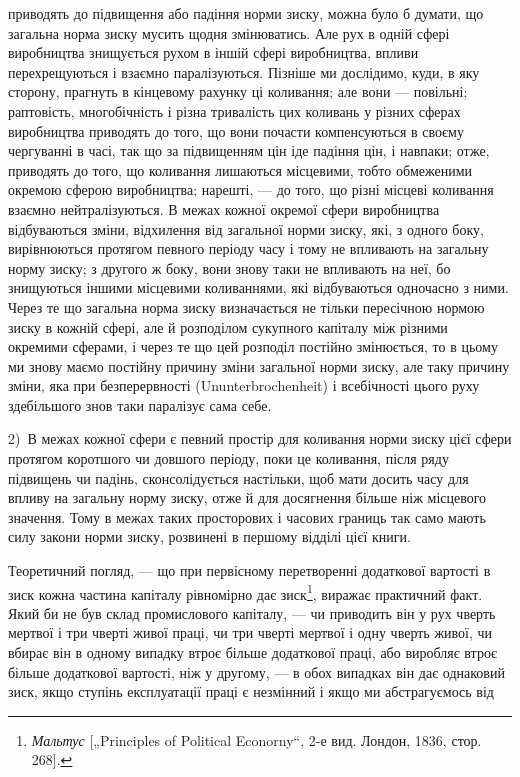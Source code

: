 \parcont{}  %
приводять до підвищення або падіння норми зиску, можна було б думати, що загальна норма зиску мусить
щодня змінюватись. Але рух в одній сфері виробництва знищується рухом в іншій сфері виробництва,
впливи перехрещуються і взаємно
паралізуються. Пізніше ми дослідимо, куди, в яку сторону, прагнуть в кінцевому рахунку ці коливання;
але вони — повільні;
раптовість, многобічність і різна тривалість цих коливань у
різних сферах виробництва приводять до того, що вони почасти компенсуються в своєму чергуванні в
часі, так що за
підвищенням цін іде падіння цін, і навпаки; отже, приводять до того, що коливання лишаються
місцевими, тобто обмеженими окремою сферою виробництва; нарешті, — до того, що різні місцеві
коливання взаємно нейтралізуються. В межах кожної окремої сфери виробництва відбуваються зміни,
відхилення
від загальної норми зиску, які, з одного боку, вирівнюються
протягом певного періоду часу і тому не впливають на загальну
норму зиску; з другого ж боку, вони знову таки не впливають
на неї, бо знищуються іншими місцевими коливаннями, які відбуваються одночасно з ними. Через те що
загальна норма зиску
визначається не тільки пересічною нормою зиску в кожній сфері,
але й розподілом сукупного капіталу між різними окремими
сферами, і через те що цей розподіл постійно змінюється, то
в цьому ми знову маємо постійну причину зміни загальної норми
зиску, але таку причину зміни, яка при безперервності (Ununterbrochenheit)
і всебічності цього руху
здебільшого знов таки
паралізує сама себе.

2)~В межах кожної сфери є певний простір для коливання
норми зиску цієї сфери протягом коротшого чи довшого періоду, поки це коливання, після ряду
підвищень чи падінь,
сконсолідується настільки, щоб мати досить часу для впливу
на загальну норму зиску, отже й для досягнення більше ніж
місцевого значення. Тому в межах таких просторових і часових границь так само мають силу закони
норми зиску, розвинені в першому відділі цієї книги.

Теоретичний погляд, — що при первісному перетворенні додаткової вартості в зиск кожна частина
капіталу рівномірно
дає зиск\footnote{
\emph{Мальтус} [„Principles of Political Econorny“, 2-е вид. Лондон, 1836, стор. 268].
}, виражає практичний факт. Який би не був склад промислового капіталу, — чи приводить він
у рух чверть мертвої
і три чверті живої праці, чи три чверті мертвої і одну чверть
живої, чи вбирає він в одному випадку втроє більше додаткової
праці, або виробляє втроє більше додаткової вартості, ніж у другому, — в обох випадках він дає
однаковий зиск, якщо ступінь
експлуатації праці є незмінний і якщо ми абстрагуємось від
\parbreak{}  %
